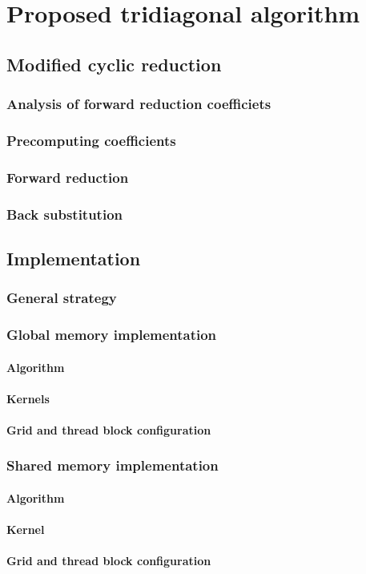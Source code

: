 \chapter{Proposed tridiagonal algorithm}

\section{Modified cyclic reduction}
\subsection{Analysis of forward reduction coefficiets}
\subsection{Precomputing coefficients}
\subsection{Forward reduction}
\subsection{Back substitution}

\section{Implementation}
\subsection{General strategy}
\subsection{Global memory implementation}
\subsubsection{Algorithm}
\subsubsection{Kernels}
\subsubsection{Grid and thread block configuration}

\subsection{Shared memory implementation}
\subsubsection{Algorithm}
\subsubsection{Kernel}
\subsubsection{Grid and thread block configuration}
